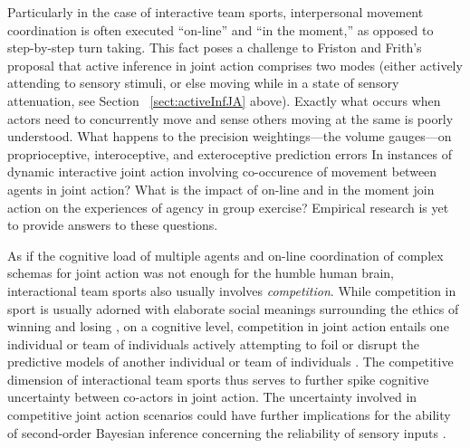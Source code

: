 \begin{CJK}{UTF8}{gbsn}
    Particularly in the case of interactive team sports, interpersonal movement coordination is often executed ``on-line'' and ``in the moment,'' as opposed to step-by-step turn taking.  This fact poses a challenge to Friston and Frith's proposal that active inference in joint action comprises two modes (either actively attending to sensory stimuli, or else moving while in a state of sensory attenuation, see Section ~\ref{sect:activeInfJA} above).  Exactly what occurs when actors need to concurrently move and sense others moving at the same is poorly understood.  What happens to the precision weightings---the volume gauges---on proprioceptive, interoceptive, and exteroceptive prediction errors In instances of dynamic interactive joint action involving co-occurence of movement between agents in joint action?   What is the impact of on-line and in the moment join action on the experiences of agency in group exercise?  Empirical research is yet to provide answers to these questions.

    As if the cognitive load of multiple agents and on-line coordination of complex schemas for joint action was not enough for the humble human brain, interactional team sports also usually involves \textit{competition}.  While competition in sport is usually adorned with elaborate social meanings surrounding the ethics of winning and losing \citep{McNamee2008}, on a cognitive level, competition in joint action entails one individual or team of individuals actively attempting to foil or disrupt the predictive models of another individual or team of individuals \citep{Reimer2006}.  The competitive dimension of interactional team sports thus serves to further spike cognitive uncertainty between co-actors in joint action.  The uncertainty involved in competitive joint action scenarios could have further implications for the ability of second-order Bayesian inference concerning the reliability of sensory inputs \citep{Pezzulo2014}.


\end{CJK}

